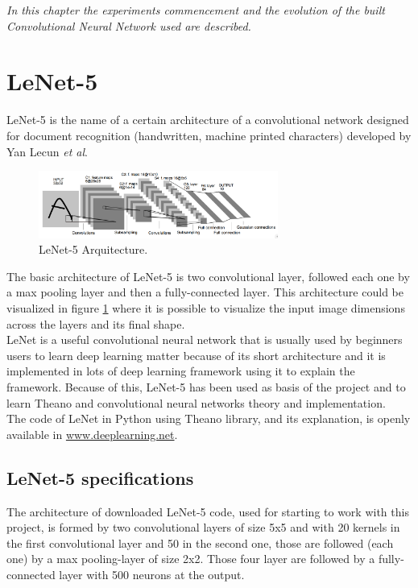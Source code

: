 \begin{small}
\emph{In this chapter the experiments commencement
 and the evolution of the built Convolutional Neural Network used are described.\\}
\end{small}

\section{LeNet-5}
LeNet-5 \cite{Lenet5} is the name of a certain architecture of a convolutional network designed for document recognition (handwritten, machine printed characters) developed by Yan Lecun \textit{et al}.\\

\begin{figure}[htb]
  \centering
  \includegraphics[width=0.7\textwidth]{images/images_lenet/LenetArquitectura.png}
  \caption{LeNet-5 Arquitecture.}
  \label{Lenet5Arquitectura}
\end{figure}

The basic architecture of LeNet-5 is two convolutional layer, followed each one by a max pooling layer and then a fully-connected layer. This architecture could be visualized in figure \ref{Lenet5Arquitectura} where it is possible to visualize the input image dimensions across the layers and its final shape.\\

LeNet is a useful convolutional neural network that is usually used by beginners users to learn deep learning matter because of its short architecture and it is implemented in lots of deep learning framework using it to explain the framework. Because of this, LeNet-5 has been used as basis of the project and to learn Theano and convolutional neural networks theory and implementation.\\

The code of LeNet in Python using Theano library, and its explanation, is openly available in \url{www.deeplearning.net}.

\subsection{LeNet-5 specifications}
The architecture of downloaded LeNet-5 code, used for starting to work with this project, is formed by two convolutional layers of size 5x5 and with 20 kernels in the first convolutional layer and 50 in the second one, those are followed (each one) by a max pooling-layer of size 2x2. Those four layer are followed by a fully-connected layer with 500 neurons at the output.\\

